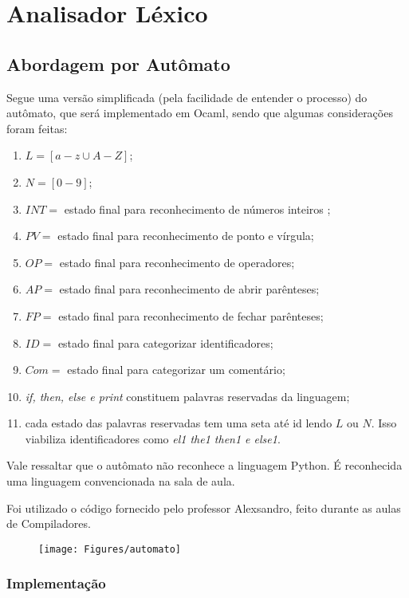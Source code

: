 \documentclass[hidelinks,12pt]{article}
\begin{document}
\section{Analisador Léxico}

\subsection{Abordagem por Autômato}

	Segue uma versão simplificada (pela facilidade de entender o processo) do autômato, que será implementado em Ocaml, sendo que algumas considerações foram feitas:
	
	\begin{enumerate}
		\item $L = [a - z \cup A - Z] $;
		\item $N = [0 - 9]$;
		\item $INT = $ estado final para reconhecimento de números inteiros ;
		\item $PV = $ estado final para reconhecimento de ponto e vírgula;
		\item $OP = $ estado final para reconhecimento de operadores;
		\item $AP = $ estado final para reconhecimento de abrir parênteses;
		\item $FP = $ estado final para reconhecimento de fechar parênteses;
		\item $ID = $ estado final para categorizar identificadores;
		\item $Com = $ estado final para categorizar um comentário;
		\item \textit{if, then, else e print} constituem palavras reservadas da linguagem;
		\item cada estado das palavras reservadas tem uma seta até id lendo $L$ ou $N$. Isso viabiliza identificadores como \textit{el1 the1 then1 e else1}.
	\end{enumerate} 
	
	Vale ressaltar que o autômato não reconhece a linguagem Python. É reconhecida uma linguagem convencionada na sala de aula.
	
	Foi utilizado o código fornecido pelo professor Alexsandro, feito durante as aulas de Compiladores.
	

	\begin{figure}[!h]
		\centering
		\texttt{[image: Figures/automato]}
	\end{figure}
	
	\subsubsection{Implementação}
	
\end{document}
